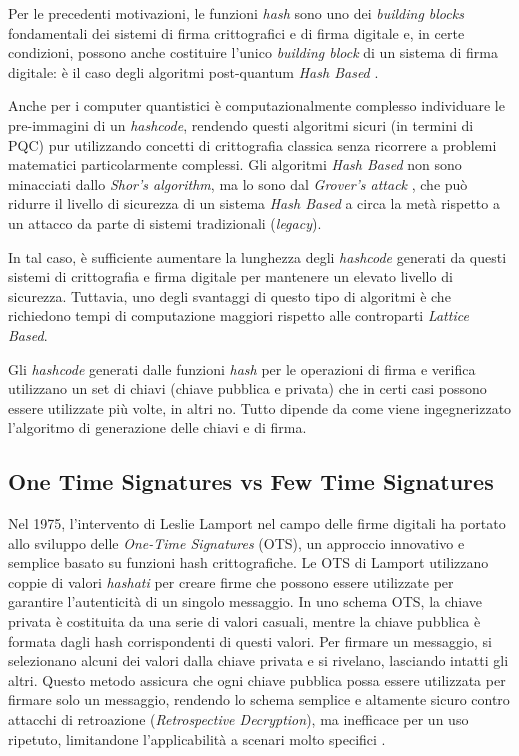 Per le precedenti motivazioni, le funzioni \textit{hash} sono uno dei \textit{building blocks} fondamentali dei sistemi di firma crittografici e di firma digitale e, in certe condizioni, possono anche costituire l'unico \textit{building block} di un sistema di firma digitale: è il caso degli algoritmi post-quantum \textit{Hash Based} \cite{enisa-pqc}.

Anche per i computer quantistici è computazionalmente complesso individuare le pre-immagini di un \textit{hashcode}, rendendo questi algoritmi sicuri (in termini di PQC) pur utilizzando concetti di crittografia classica senza ricorrere a problemi matematici particolarmente complessi. Gli algoritmi \textit{Hash Based} non sono minacciati dallo \textit{Shor's algorithm}, ma lo sono dal \textit{Grover's attack} \cite{nature-pqc}, che può ridurre il livello di sicurezza di un sistema \textit{Hash Based} a circa la metà rispetto a un attacco da parte di sistemi tradizionali (\textit{legacy}).

In tal caso, è sufficiente aumentare la lunghezza degli \textit{hashcode} generati da questi sistemi di crittografia e firma digitale per mantenere un elevato livello di sicurezza. Tuttavia, uno degli svantaggi di questo tipo di algoritmi è che richiedono tempi di computazione maggiori rispetto alle controparti \textit{Lattice Based}.

Gli \textit{hashcode} generati dalle funzioni \textit{hash} per le operazioni di firma e verifica utilizzano un set di chiavi (chiave pubblica e privata) che in certi casi possono essere utilizzate più volte, in altri no. Tutto dipende da come viene ingegnerizzato l'algoritmo di generazione delle chiavi e di firma.

\subsection{One Time Signatures vs Few Time Signatures}

Nel 1975, l'intervento di Leslie Lamport nel campo delle firme digitali ha portato allo sviluppo delle \textit{One-Time Signatures} (OTS), un approccio innovativo e semplice basato su funzioni hash crittografiche. Le OTS di Lamport utilizzano coppie di valori \textit{hashati} per creare firme che possono essere utilizzate per garantire l'autenticità di un singolo messaggio. In uno schema OTS, la chiave privata è costituita da una serie di valori casuali, mentre la chiave pubblica è formata dagli hash corrispondenti di questi valori. Per firmare un messaggio, si selezionano alcuni dei valori dalla chiave privata e si rivelano, lasciando intatti gli altri. Questo metodo assicura che ogni chiave pubblica possa essere utilizzata per firmare solo un messaggio, rendendo lo schema semplice e altamente sicuro contro attacchi di retroazione (\textit{Retrospective Decryption}), ma inefficace per un uso ripetuto, limitandone l'applicabilità a scenari molto specifici \cite{nature-pqc}.

